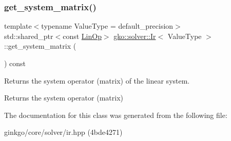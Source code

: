\subsubsection{\texorpdfstring{get\+\_\+system\+\_\+matrix()}{get\_system\_matrix()}}
{\footnotesize\ttfamily template$<$typename Value\+Type  = default\+\_\+precision$>$ \\
std\+::shared\+\_\+ptr$<$const \hyperlink{classgko_1_1LinOp}{Lin\+Op}$>$ \hyperlink{classgko_1_1solver_1_1Ir}{gko\+::solver\+::\+Ir}$<$ Value\+Type $>$\+::get\+\_\+system\+\_\+matrix (\begin{DoxyParamCaption}{ }\end{DoxyParamCaption}) const\hspace{0.3cm}{\ttfamily [inline]}}



Returns the system operator (matrix) of the linear system. 

\begin{DoxyReturn}{Returns}
the system operator (matrix) 
\end{DoxyReturn}


The documentation for this class was generated from the following file\+:\begin{DoxyCompactItemize}
\item 
ginkgo/core/solver/ir.\+hpp (4bde4271)\end{DoxyCompactItemize}
